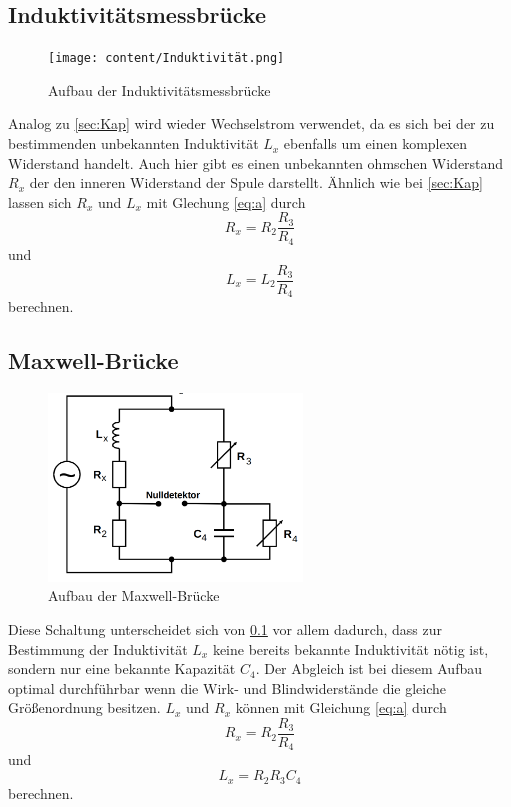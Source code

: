 \subsection{Induktivitätsmessbrücke}
\label{sec:Ind}
\begin{figure}[H]
\centering
    \texttt{[image: content/Induktivität.png]}
    \caption{Aufbau der Induktivitätsmessbrücke\cite[221]{sample}}
\end{figure}
Analog zu \ref{sec:Kap} wird wieder Wechselstrom
verwendet, da es sich bei der zu bestimmenden
unbekannten Induktivität $L_x$ ebenfalls um einen
komplexen Widerstand handelt. Auch hier gibt es einen
unbekannten ohmschen Widerstand $R_x$ der den
inneren Widerstand der Spule darstellt. Ähnlich wie
bei \ref{sec:Kap} lassen sich $R_x$ und $L_x$ mit
Glechung \ref{eq:a} durch
\begin{equation}
    R_x=R_2\frac{R_3}{R_4}
    \label{eq:6}
\end{equation}
\noindent und
\begin{equation}
    L_x=L_2\frac{R_3}{R_4}
    \label{eq:7}
\end{equation}
\noindent berechnen.



\subsection{Maxwell-Brücke}
\begin{figure}[H]
\centering
    \includegraphics[height= 5cm]{content/Maxwell.png}
    \caption{Aufbau der Maxwell-Brücke\cite[222]{sample}}
\end{figure}

\noindent Diese Schaltung unterscheidet sich von
\ref{sec:Ind} vor allem dadurch, dass zur Bestimmung
der Induktivität $L_x$ keine bereits bekannte
Induktivität nötig ist, sondern nur eine
bekannte Kapazität $C_4$. Der Abgleich ist bei
diesem Aufbau optimal durchführbar wenn
die Wirk- und Blindwiderstände die gleiche
Größenordnung besitzen. $L_x$ und $R_x$ können 
mit Gleichung \ref{eq:a} durch
\begin{equation}
    R_x=R_2\frac{R_3}{R_4}
    \label{eq:12}
\end{equation}
\noindent und
\begin{equation}
    L_x=R_2R_3C_4
    \label{eq:13}
\end{equation}
\noindent berechnen.




